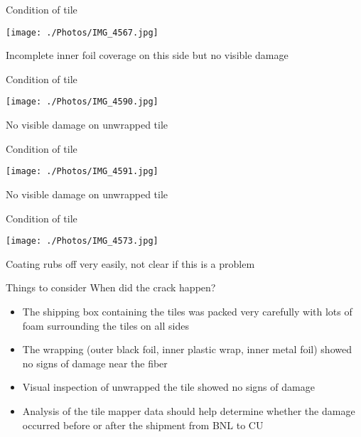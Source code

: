 \documentclass[compress,10pt]{beamer} %
\begin{document}
\begin{frame}{Condition of tile}
\begin{adjustwidth}{-3em}{-3em}
\begin{center}
\texttt{[image: ./Photos/IMG\_4567.jpg]}
\end{center}
\end{adjustwidth}
Incomplete inner foil coverage on this side but no visible damage
\end{frame}

\begin{frame}{Condition of tile}
\begin{adjustwidth}{-3em}{-3em}
\begin{center}
\texttt{[image: ./Photos/IMG\_4590.jpg]}
\end{center}
\end{adjustwidth}
No visible damage on unwrapped tile
\end{frame}

\begin{frame}{Condition of tile}
\begin{adjustwidth}{-3em}{-3em}
\begin{center}
\texttt{[image: ./Photos/IMG\_4591.jpg]}
\end{center}
\end{adjustwidth}
No visible damage on unwrapped tile
\end{frame}

\begin{frame}{Condition of tile}
\begin{adjustwidth}{-3em}{-3em}
\begin{center}
\texttt{[image: ./Photos/IMG\_4573.jpg]}
\end{center}
\end{adjustwidth}
Coating rubs off very easily, not clear if this is a problem
\end{frame}


\begin{frame}{Things to consider}
When did the crack happen?
\begin{itemize}
\item The shipping box containing the tiles was packed very carefully with lots of foam surrounding the tiles on all sides
\item The wrapping (outer black foil, inner plastic wrap, inner metal foil) showed no signs of damage near the fiber
\item Visual inspection of unwrapped the tile showed no signs of damage
\item Analysis of the tile mapper data should help determine whether the damage occurred before or after the shipment from BNL to CU
\end{itemize}
\end{frame}
\end{document}
